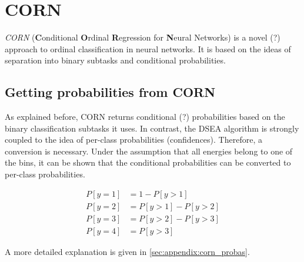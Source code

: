 \section{CORN}
\emph{CORN} (\textbf{C}onditional \textbf{O}rdinal \textbf{R}egression for \textbf{N}eural Networks) \cite{corn}
is a novel (?) approach to ordinal classification in neural networks.
It is based on the ideas of separation into binary subtasks and conditional probabilities.


\subsection{Getting probabilities from CORN} %
As explained before,
CORN returns conditional (?) probabilities based on the binary classification subtasks it uses.
In contrast,
the DSEA algorithm is strongly coupled to the idea of per-class probabilities (confidences).
Therefore, a conversion is necessary.
Under the assumption that all energies belong to one of the bins,
it can be shown that the conditional probabilities can be converted to per-class probabilities.

\begin{align}
  P[y=1] &= 1 - P[y>1] \\
  P[y=2] &= P[y>1] - P[y>2] \\
  P[y=3] &= P[y>2] - P[y>3] \\
  P[y=4] &= P[y>3]
\end{align}

A more detailed explanation is given in \autoref{sec:appendix:corn_probas}.
